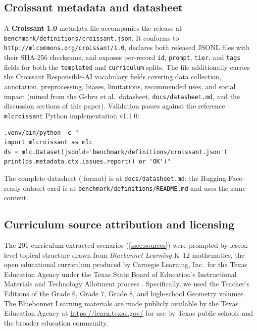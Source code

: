 \subsection{Croissant metadata and datasheet}

A \textbf{Croissant 1.0} metadata file accompanies the release at \texttt{benchmark/definitions/croissant.json}.
It conforms to \texttt{http://mlcommons.org/croissant/1.0}, declares both released JSONL files with their SHA-256 checksums, and exposes per-record \texttt{id}, \texttt{prompt}, \texttt{tier}, and \texttt{tags} fields for both the \texttt{templated} and \texttt{curriculum} splits.
The file additionally carries the Croissant Responsible-AI vocabulary fields covering data collection, annotation, preprocessing, biases, limitations, recommended uses, and social impact (mined from the Gebru et al.\ datasheet, \texttt{docs/datasheet.md}, and the discussion sections of this paper).
Validation passes against the reference \texttt{mlcroissant} Python implementation v1.1.0:
\begin{lstlisting}
.venv/bin/python -c "
import mlcroissant as mlc
ds = mlc.Dataset(jsonld='benchmark/definitions/croissant.json')
print(ds.metadata.ctx.issues.report() or 'OK')"
\end{lstlisting}
The complete \GeoGen datasheet (\citealp{gebru2021datasheets} format) is at \texttt{docs/datasheet.md}; the Hugging-Face-ready dataset card is at \texttt{benchmark/definitions/README.md} and uses the same content.

\subsection{Curriculum source attribution and licensing}
\label{app:curriculum_attribution}

The 201 curriculum-extracted scenarios (\cref{ssec:sources}) were prompted by lesson-level topical structure drawn from \textit{Bluebonnet Learning} K--12 mathematics, the open educational curriculum produced by Carnegie Learning, Inc.\ for the Texas Education Agency under the Texas State Board of Education's Instructional Materials and Technology Allotment process \citep{bluebonnet2024}.
Specifically, we used the Teacher's Editions of the Grade 6, Grade 7, Grade 8, and high-school Geometry volumes.
The Bluebonnet Learning materials are made publicly available by the Texas Education Agency at \url{https://learn.texas.gov/} for use by Texas public schools and the broader education community.

